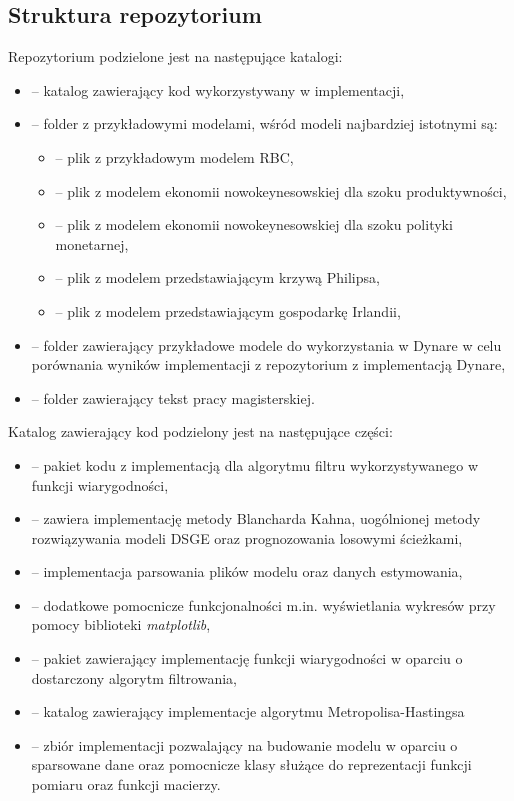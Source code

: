 \subsection{Struktura repozytorium}

Repozytorium podzielone jest na następujące katalogi:
\begin{itemize}
    \item {} -- katalog zawierający kod wykorzystywany w implementacji,
    \item {} -- folder z przykładowymi modelami, wśród modeli najbardziej istotnymi są:
        \begin{itemize}
            \item {} -- plik z przykładowym modelem RBC,
            \item {} -- plik z modelem ekonomii nowokeynesowskiej dla szoku produktywności,
            \item {} -- plik z modelem ekonomii nowokeynesowskiej dla szoku polityki monetarnej,
            \item {} -- plik z modelem przedstawiającym krzywą Philipsa,
            \item {} -- plik z modelem przedstawiającym gospodarkę Irlandii,
        \end{itemize}
    \item {} -- folder zawierający przykładowe modele do wykorzystania w Dynare w celu porównania wyników implementacji z repozytorium z implementacją Dynare,
    \item {} -- folder zawierający tekst pracy magisterskiej.
\end{itemize}

Katalog zawierający kod podzielony jest na następujące części:
\begin{itemize}
    \item {} -- pakiet kodu z implementacją dla algorytmu filtru wykorzystywanego w funkcji wiarygodności,
    \item {} -- zawiera implementację metody Blancharda Kahna, uogólnionej metody rozwiązywania modeli DSGE oraz prognozowania losowymi ścieżkami,
    \item {} -- implementacja parsowania plików modelu oraz danych estymowania,
    \item {} -- dodatkowe pomocnicze funkcjonalności m.in. wyświetlania wykresów przy pomocy biblioteki \emph{matplotlib},
    \item {} -- pakiet zawierający implementację funkcji wiarygodności w oparciu o dostarczony algorytm filtrowania,
    \item {} -- katalog zawierający implementacje algorytmu Metropolisa-Hastingsa
    \item {} -- zbiór implementacji pozwalający na budowanie modelu w oparciu o sparsowane dane oraz pomocnicze klasy służące do reprezentacji funkcji pomiaru oraz funkcji macierzy.
\end{itemize}

